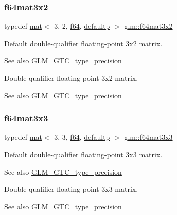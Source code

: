 \subsubsection{\texorpdfstring{f64mat3x2}{f64mat3x2}}
{\footnotesize\ttfamily typedef \hyperlink{structglm_1_1mat}{mat}$<$ 3, 2, \hyperlink{group__gtc__type__precision_ga2bba392e555124b36cde6abba349bab3}{f64}, \hyperlink{namespaceglm_a36ed105b07c7746804d7fdc7cc90ff25a9d21ccd8b5a009ec7eb7677befc3bf51}{defaultp} $>$ \hyperlink{group__gtc__type__precision_ga311a3bf48bfe2c95150e9f71db9063c5}{glm\+::f64mat3x2}}

Default double-\/qualifier floating-\/point 3x2 matrix. \begin{DoxySeeAlso}{See also}
\hyperlink{group__gtc__type__precision}{G\+L\+M\+\_\+\+G\+T\+C\+\_\+type\+\_\+precision}
\end{DoxySeeAlso}
Double-\/qualifier floating-\/point 3x2 matrix. \begin{DoxySeeAlso}{See also}
\hyperlink{group__gtc__type__precision}{G\+L\+M\+\_\+\+G\+T\+C\+\_\+type\+\_\+precision} 
\end{DoxySeeAlso}
\mbox{\label{group__gtc__type__precision_ga3b494201796c4200886e59f9695ecff0}} 
\subsubsection{\texorpdfstring{f64mat3x3}{f64mat3x3}}
{\footnotesize\ttfamily typedef \hyperlink{structglm_1_1mat}{mat}$<$ 3, 3, \hyperlink{group__gtc__type__precision_ga2bba392e555124b36cde6abba349bab3}{f64}, \hyperlink{namespaceglm_a36ed105b07c7746804d7fdc7cc90ff25a9d21ccd8b5a009ec7eb7677befc3bf51}{defaultp} $>$ \hyperlink{group__gtc__type__precision_ga3b494201796c4200886e59f9695ecff0}{glm\+::f64mat3x3}}

Default double-\/qualifier floating-\/point 3x3 matrix. \begin{DoxySeeAlso}{See also}
\hyperlink{group__gtc__type__precision}{G\+L\+M\+\_\+\+G\+T\+C\+\_\+type\+\_\+precision}
\end{DoxySeeAlso}
Double-\/qualifier floating-\/point 3x3 matrix. \begin{DoxySeeAlso}{See also}
\hyperlink{group__gtc__type__precision}{G\+L\+M\+\_\+\+G\+T\+C\+\_\+type\+\_\+precision} 
\end{DoxySeeAlso}
\mbox{\label{group__gtc__type__precision_gaddb7f46e5a007c31348305de542e0d52}} 
